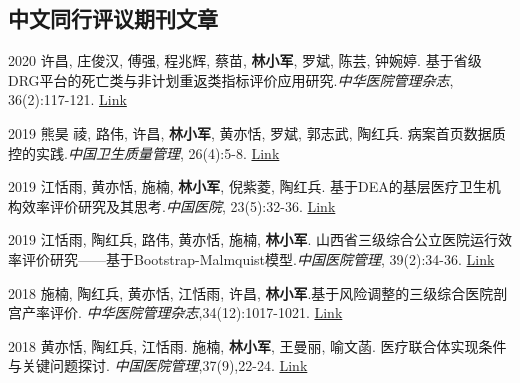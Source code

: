 \documentclass[12pt,letterpaper]{report}
\begin{document}
\subsection*{中文同行评议期刊文章}
    \begin{tablist}

		\item[2020]  \tab  许昌, 庄俊汉, 傅强, 程兆辉, 蔡苗, \textbf{林小军}, 罗斌, 陈芸, 钟婉婷. 基于省级DRG平台的死亡类与非计划重返类指标评价应用研究.\emph{中华医院管理杂志}, 36(2):117-121. \href{http://www.wanfangdata.com.cn/details/detail.do?_type=perio&id=zhyygl202002004}{Link}\\[5pt]
		
		\item[2019]  \tab  熊昊{ 祾}, 路伟, 许昌, \textbf{林小军}, 黄亦恬, 罗斌, 郭志武, 陶红兵. 病案首页数据质控的实践.\emph{中国卫生质量管理}, 26(4):5-8. \href{https://kns.cnki.net/KCMS/detail/detail.aspx?dbcode=CJFD&dbname=CJFDLAST2019&filename=WSJG201904005&v=MzE4MzVUcldNMUZyQ1VSN3FmWWVSc0ZpRGdVTHpNTWo3QmFiRzRIOWpNcTQ5RllZUjhlWDFMdXhZUzdEaDFUM3E=}{Link}\\[5pt]
		
		\item[2019]  \tab  江恬雨, 黄亦恬, 施楠,  \textbf{林小军}, 倪紫菱, 陶红兵. 基于DEA的基层医疗卫生机构效率评价研究及其思考.\emph{中国医院}, 23(5):32-36. \href{https://kns.cnki.net/KCMS/detail/detail.aspx?dbcode=CJFD&dbname=CJFDLAST2019&filename=ZGYU201905010&v=MjgyNDZxZlllUnNGaURnV3JySVB5clNlN0c0SDlqTXFvOUVaSVI4ZVgxTHV4WVM3RGgxVDNxVHJXTTFGckNVUjc=}{Link}\\[5pt]

		\item[2019]  \tab  江恬雨, 陶红兵, 路伟, 黄亦恬, 施楠, \textbf{林小军}. 山西省三级综合公立医院运行效率评价研究——基于Bootstrap-Malmquist模型.\emph{中国医院管理}, 39(2):34-36. \href{https://kns.cnki.net/KCMS/detail/detail.aspx?dbcode=CJFQ&dbname=CJFDLAST2019&filename=YYGL201902016&v=MDYyNDJUTVlyRzRIOWpNclk5RVlvUjhlWDFMdXhZUzdEaDFUM3FUcldNMUZyQ1VSN3FmWWVSc0Z5bm1VcjdQUEQ=}{Link}\\[5pt]
		
		\item[2018]  \tab  施楠, 陶红兵, 黄亦恬, 江恬雨, 许昌, \textbf{林小军}.基于风险调整的三级综合医院剖宫产率评价. \emph{中华医院管理杂志},34(12):1017-1021. \href{http://www.wanfangdata.com.cn/details/detail.do?_type=perio&id=zhyygl201812011}{Link} \\[5pt]

		\item[2018]  \tab  黄亦恬, 陶红兵, 江恬雨. 施楠, \textbf{林小军}, 王曼丽, 喻文菡. 医疗联合体实现条件与关键问题探讨. \emph{中国医院管理},37(9),22-24. \href{http://kns.cnki.net/KCMS/detail/detail.aspx?dbcode=CJFQ&dbname=CJFDLAST2018&filename=YYGL201809005&v=MjIxMjdlWnVadEZpRGxWNzNPUERUTVlyRzRIOW5NcG85RllZUjhlWDFMdXhZUzdEaDFUM3FUcldNMUZyQ1VSTEs=}{Link} \\[5pt]


\end{tablist}
\end{document}
